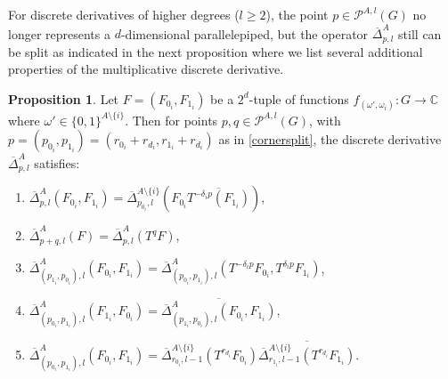 \documentclass{amsart}
\theoremstyle{definition}
\newtheorem{proposition}[theorem]{Proposition}
\theoremstyle{remark}
\numberwithin{equation}{section}
\begin{document}
For discrete derivatives of higher degrees ($l \ge 2$), the point $p \in \mathcal{P}^{A,l}(G)$ no longer represents a $d$-dimensional parallelepiped, but the operator $\overline{\Delta}^A_{p,l}$  still can be  split as indicated in the next proposition where we list several additional properties of the multiplicative discrete derivative. 

\begin{proposition} 
\label{prop:dersplit}
Let $F=(F_{0_i}, F_{1_i})$ be a $2^d$-tuple of functions $f_{(\omega', \omega_i)}: G \to \mathbb{C}$ where $\omega' \in \{0,1\}^{A \setminus \{i\}}$. Then for  points  $p, q  \in \mathcal{P}^{A,l}(G)$, with $p=(p_{0_i}, p_{1_i}) =  (r_{0_i}+r_{d_i},r_{1_i}+r_{d_i})$ as in \eqref{cornersplit}, the discrete derivative $\overline{\Delta}^A_{p,l}$ satisfies:

\renewcommand{\labelenumi}{\roman{enumi})}
\begin{enumerate}
    
\item $\displaystyle \overline{\Delta}^A_{p,l} (F_{0_i}, F_{1_i}) = \overline{\Delta}^{A\setminus \{i\}}_{p_{0_i},l}\left( F_{0_i} \overline{T^{- \delta_i p}(F_{1_i})}\right)$, 


\item $\displaystyle\overline{\Delta}^A_{p+q,l} (F) = \overline{\Delta}^A_{p,l} (T^qF)$,

\item $\displaystyle\overline{\Delta}^A_{(p_{1_i},p_{0_i}),l} (F_{0_i}, F_{1_i}) = \overline{\Delta}^A_{(p_{0_i},p_{1_i}),l} (T^{-\delta_i p}F_{0_i}, T^{\delta_i p}F_{1_i})$,

\item
$\displaystyle\overline{\Delta}^A_{(p_{0_i},p_{1_i}),l} (F_{1_i}, F_{0_i}) = \overline{\overline{\Delta}^A_{(p_{1_i},p_{0_i}),l} (F_{0_i}, F_{1_i}) } ,$

\item $\displaystyle \overline{\Delta}^A_{(p_{0_i},p_{1_i}),l} (F_{0_i}, F_{1_i}) =
\overline{\Delta}^{A\setminus \{i\}}_{r_{0_i},l-1}\left( T^{r_{d_i}}F_{0_i}\right) \overline{
\overline{\Delta}^{A\setminus \{i\}}_{r_{1_i},l-1}\left( T^{r_{d_i}}F_{1_i}\right)}.$
\end{enumerate}
\end{proposition}
\end{document}

